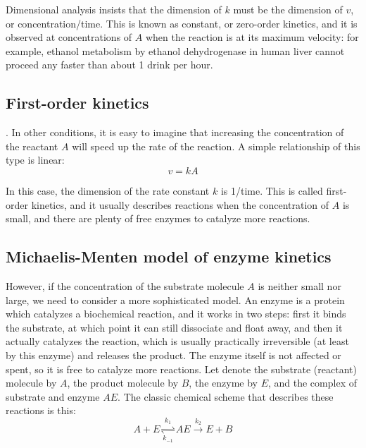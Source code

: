 \documentclass[
]{book}
\theoremstyle{definition}
\theoremstyle{definition}
\theoremstyle{definition}
\theoremstyle{remark}
\begin{document}
Dimensional analysis insists that the dimension of \(k\) must be the dimension of \(v\), or concentration/time. This is known as constant, or zero-order kinetics, and it is observed at concentrations of \(A\) when the reaction is at its maximum velocity: for example, ethanol metabolism by ethanol dehydrogenase in human liver cannot proceed any faster than about 1 drink per hour.

\hypertarget{first-order-kinetics}{%
\subsection{First-order kinetics}\label{first-order-kinetics}}

. In other conditions, it is easy to imagine that increasing the concentration of the reactant \(A\) will speed up the rate of the reaction. A simple relationship of this type is linear:
\begin{equation}
v = kA
\label{eq:kinetics_1st_order}
\end{equation}

In this case, the dimension of the rate constant \(k\) is 1/time. This is called first-order kinetics, and it usually describes reactions when the concentration of \(A\) is small, and there are plenty of free enzymes to catalyze more reactions.

\hypertarget{michaelis-menten-model-of-enzyme-kinetics}{%
\subsection{\texorpdfstring{Michaelis-Menten model of enzyme kinetics }{Michaelis-Menten model of enzyme kinetics }}\label{michaelis-menten-model-of-enzyme-kinetics}}

However, if the concentration of the substrate molecule \(A\) is neither small nor large, we need to consider a more sophisticated model. An enzyme is a protein which catalyzes a biochemical reaction, and it works in two steps: first it binds the substrate, at which point it can still dissociate and float away, and then it actually catalyzes the reaction, which is usually practically irreversible (at least by this enzyme) and releases the product. The enzyme itself is not affected or spent, so it is free to catalyze more reactions. Let denote the substrate (reactant) molecule by \(A\), the product molecule by \(B\), the enzyme by \(E\), and the complex of substrate and enzyme \(AE\). The classic chemical scheme that describes these reactions is this:
\[
A + E \underset{k_{-1}}{\overset{k_1}{\rightleftharpoons}} AE  \xrightarrow{k_2} E + B
\]
\end{document}
